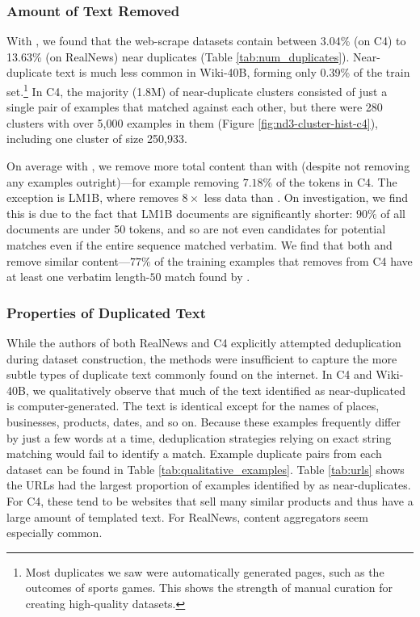 \subsubsection{Amount of Text Removed}
With \Approx{}, we found that the web-scrape datasets contain between 3.04\% (on C4) to 13.63\% (on RealNews) near duplicates (Table \ref{tab:num_duplicates}).
Near-duplicate text is much less common in Wiki-40B, forming only 0.39\% of the train set.\footnote{Most duplicates we saw were automatically generated pages, such as the outcomes of sports games.
This shows the strength of manual curation for creating high-quality datasets.}
In C4, the majority (1.8M) of near-duplicate clusters consisted of just a single pair of examples that matched against each other, but there were 280 clusters with over 5,000 examples in them (Figure \ref{fig:nd3-cluster-hist-c4}), including one cluster of size 250,933.

On average with \Exact{}, we remove more total content than with \Approx{} (despite \Exact{} not removing any examples outright)---for example removing $7.18\%$ of the tokens in C4.
%
The exception is LM1B, where \Exact{} removes $8\times$ less data than
\Approx{}.
On investigation, we find this is due to the fact that LM1B documents are significantly shorter: $90\%$ of all documents are under 50 tokens, and so are not even candidates for potential matches even if the entire sequence matched verbatim.
%
We find that both \Approx{} and \Exact{} remove similar content---$77\%$ of the training examples that \Approx{} removes from C4 have at least one verbatim length-$50$ match found by \Exact{}.





\subsubsection{Properties of Duplicated Text}
While the authors of both RealNews and C4 explicitly attempted deduplication during dataset construction, the methods were insufficient to capture the more subtle types of duplicate text commonly found on the internet.
In C4 and Wiki-40B, we qualitatively observe that much of the text identified as near-duplicated is computer-generated.
The text is identical except for the names of places, businesses, products, dates, and so on. 
Because these examples frequently differ by just a few words at a time, deduplication strategies relying on exact string matching would fail to identify a match.
Example duplicate pairs from each dataset can be found in Table \ref{tab:qualitative_examples}.
Table \ref{tab:urls} shows the URLs had the largest proportion of examples identified by \Approx{} as near-duplicates. 
For C4, these tend to be websites that sell many similar products and thus have a large amount of templated text.
For RealNews, content aggregators seem especially common.

